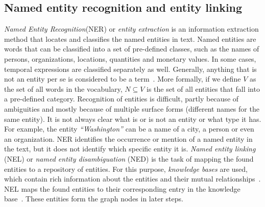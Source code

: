 \subsection{Named entity recognition and  entity linking}\label{subsec:entity_recog}
\emph{Named Entity Recognition}(NER)  or \emph{entity extraction} is an information extraction method that locates and classifies the named entities in text. Named entities are words that can be classified into a set of pre-defined classes, such as the names of persons, organizations, locations, quantities and monetary values. In some cases, temporal expressions are classified separately as well. Generally, anything that is not an entity per se is considered to be a term~. More formally, if we define $V$ as the set of all words in the vocabulary, $N\subseteq V$ is the set of all entities that fall into a pre-defined category.
Recognition of entities is difficult, partly because of ambiguities and mostly because of multiple surface forms (different names for the same entity).
It is not always clear what is or is not an entity or what type it has. For example, the entity \emph{``Washington''} can be a name of a city, a person or even an organization. NER identifies the occurrence or mention of a named entity in the text, but it does not identify which specific entity it is. \emph{Named entity linking} (NEL) or \emph{named entity disambiguation} (NED) is the task of mapping the found entities to a repository of entities. For this purpose, \emph{knowledge bases} are used, which contain rich information about the entities and their mutual relationships~. NEL maps the found entities to their corresponding entry in the knowledge base~. 
These entities form the graph nodes in later steps. 
